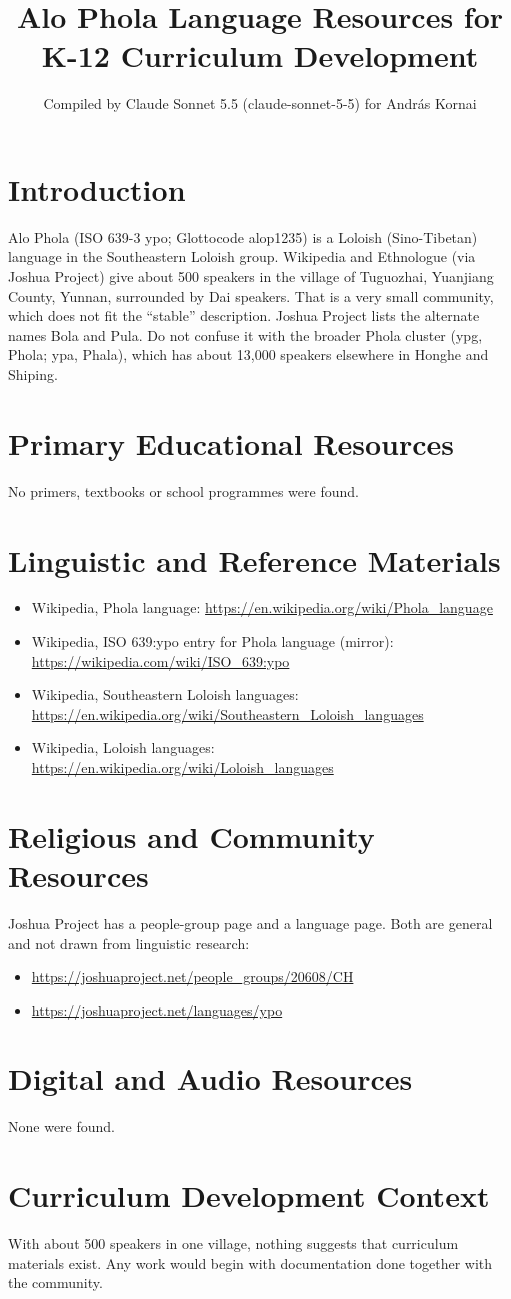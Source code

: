 \documentclass[12pt]{article}
\title{Alo Phola Language Resources for K-12 Curriculum Development}
\author{Compiled by Claude Sonnet 5.5 (claude-sonnet-5-5) for Andr\'as Kornai}
\date{}
\begin{document}
\maketitle

\section{Introduction}
Alo Phola (ISO 639-3 ypo; Glottocode alop1235) is a Loloish (Sino-Tibetan) language in the Southeastern Loloish group. Wikipedia and Ethnologue (via Joshua Project) give about 500 speakers in the village of Tuguozhai, Yuanjiang County, Yunnan, surrounded by Dai speakers. That is a very small community, which does not fit the ``stable'' description. Joshua Project lists the alternate names Bola and Pula. Do not confuse it with the broader Phola cluster (ypg, Phola; ypa, Phala), which has about 13,000 speakers elsewhere in Honghe and Shiping.

\section{Primary Educational Resources}
No primers, textbooks or school programmes were found.

\section{Linguistic and Reference Materials}
\begin{itemize}
\item Wikipedia, Phola language: \url{https://en.wikipedia.org/wiki/Phola_language}
\item Wikipedia, ISO 639:ypo entry for Phola language (mirror): \url{https://wikipedia.com/wiki/ISO_639:ypo}
\item Wikipedia, Southeastern Loloish languages: \url{https://en.wikipedia.org/wiki/Southeastern_Loloish_languages}
\item Wikipedia, Loloish languages: \url{https://en.wikipedia.org/wiki/Loloish_languages}
\end{itemize}

\section{Religious and Community Resources}
Joshua Project has a people-group page and a language page. Both are general and not drawn from linguistic research:
\begin{itemize}
\item \url{https://joshuaproject.net/people_groups/20608/CH}
\item \url{https://joshuaproject.net/languages/ypo}
\end{itemize}

\section{Digital and Audio Resources}
None were found.

\section{Curriculum Development Context}
With about 500 speakers in one village, nothing suggests that curriculum materials exist. Any work would begin with documentation done together with the community.
\end{document}

